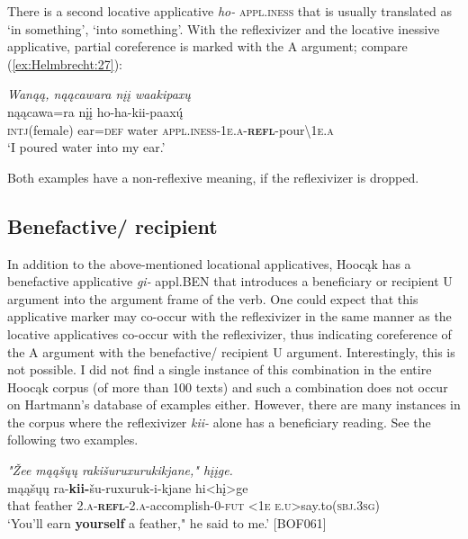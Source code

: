 \documentclass[output=paper]{langscibook}
\begin{document}
There is a second locative applicative \textit{ho-} \textsc{appl.iness} that is usually translated as `in something', `into something'. With the reflexivizer and the locative inessive applicative, partial coreference is marked with the A argument; compare (\ref{ex:Helmbrecht:27}): 

\ea   \label{ex:Helmbrecht:27} \textit{Wanąą, nąącawara nįį waakipaxų }\\
  {nąącawa=ra}  {nįį}   {ho-ha-kii-paaxų}́ \\
  {\textsc{intj}(female)}   {ear=\textsc{def}} {water} {\textsc{appl.iness-1e.a}-\textbf{\textsc{refl}}-pour{\textbackslash}\textsc{1e.a}}\\
  \glt `I poured water into my ear.' \citep[example No. 32]{Hartmann2013}
\z 

Both examples have a non-reflexive meaning, if the reflexivizer is dropped.

\subsection{Benefactive/ recipient}\label{sec:Helmbrecht:5.3}
In addition to the above-mentioned locational applicatives, Hoocąk has a benefactive applicative \textit{gi-} appl.BEN that introduces a beneficiary or recipient U argument into the argument frame of the verb. One could expect that this applicative marker may co-occur with the reflexivizer in the same manner as the locative applicatives co-occur with the reflexivizer, thus indicating coreference of the A argument with the benefactive/ recipient U argument. Interestingly, this is not possible. I did not find a single instance of this combination in the entire Hoocąk corpus (of more than 100 texts) and such a combination does not occur on Hartmann's database of examples \citep{Hartmann2013} either. However, there are many instances in the corpus where the reflexivizer \textit{kii-} alone has a beneficiary reading. See the following two examples.



\ea \label{ex:Helmbrecht:28} \textit{ "Žee mąąšųų rakišuruxurukikjane," hįįge. }\\
   {mąąšųų}  {ra-\textbf{kii-}šu-ruxuruk-i-kjane}   {hi<hį>ge}\\
  {that}  {feather}  {\textsc{2.a}-\textbf{\textsc{refl}}-\textsc{2.a}-accomplish-0-\textsc{fut}} {<\textsc{1e
  e.u}>say.to(\textsc{sbj.3sg})}\\
  \glt `You'll earn \textbf{yourself} a feather," he said to me.' [BOF061]
\z 
\end{document}
